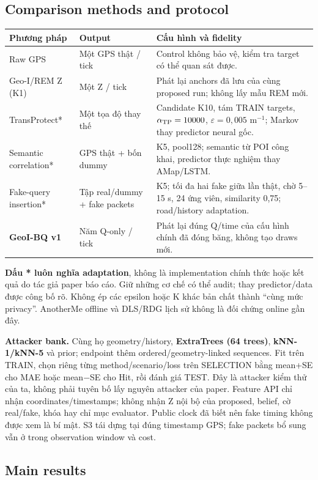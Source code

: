 \subsection{Comparison methods and protocol}
\begin{tabularx}{\linewidth}{@{}P{3.4cm}P{3.6cm}Y@{}}\toprule
\textbf{Phương pháp} & \textbf{Output} & \textbf{Cấu hình và fidelity}\\\midrule
Raw GPS & Một GPS thật / tick & Control không bảo vệ, kiểm tra target có thể quan sát được.\\
Geo-I/REM Z (K1) & Một Z / tick & Phát lại anchors đã lưu của cùng proposed run; không lấy mẫu REM mới.\\
TransProtect* & Một tọa độ thay thế & Candidate K10, tám TRAIN targets, $\alpha_{\rm TP}=10000$, $\varepsilon=0{,}005$ m$^{-1}$; Markov thay predictor neural gốc.\\
Semantic correlation* & GPS thật + bốn dummy & K5, pool128; semantic từ POI công khai, predictor thực nghiệm thay AMap/LSTM.\\
Fake-query insertion* & Tập real/dummy + fake packets & K5; tối đa hai fake giữa lần thật, chờ 5--15 s, 24 ứng viên, similarity 0,75; road/history adaptation.\\
\textbf{GeoI-BQ v1} & Năm Q-only / tick & Phát lại đúng Q/time của cấu hình chính đã đóng băng, không tạo draws mới.\\\bottomrule
\end{tabularx}
\textbf{Dấu * luôn nghĩa adaptation}, không là implementation chính thức hoặc kết quả do tác giả paper báo cáo.
Giữ những cơ chế có thể audit; thay predictor/data được công bố rõ. Không ép các epsilon hoặc K khác bản chất
thành ``cùng mức privacy''. AnotherMe offline và DLS/RDG lịch sử không là đối chứng online gần đây.

\textbf{Attacker bank.} Cùng họ geometry/history, \textbf{ExtraTrees (64 trees)}, \textbf{kNN-1/kNN-5} và prior;
endpoint thêm ordered/geometry-linked sequences. Fit trên TRAIN, chọn riêng từng method/scenario/loss trên
SELECTION bằng mean+SE cho MAE hoặc mean$-$SE cho Hit, rồi đánh giá TEST. Đây là attacker kiểm thử của ta,
không phải tuyên bố lấy nguyên attacker của paper. Feature API chỉ nhận coordinates/timestamps;
không nhận Z nội bộ của proposed, belief, cờ real/fake, khóa hay chỉ mục evaluator.
Public clock đã biết nên fake timing không được xem là bí mật. S3 tái dựng tại đúng timestamp GPS;
fake packets bổ sung vẫn ở trong observation window và cost.

\clearpage
\subsection{Main results}
